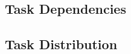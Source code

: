


\subsection{Task Dependencies}
\label{subsec:task_dependencies}


\subsection{Task Distribution}
\label{subsec:task_distribution}

